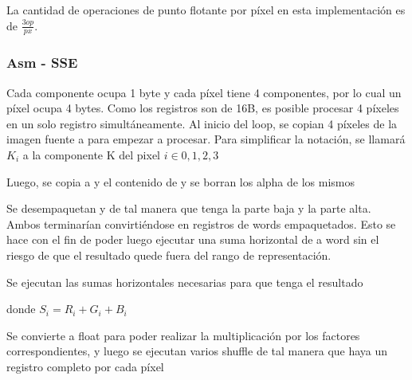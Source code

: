 La cantidad de operaciones de punto flotante por píxel en esta implementación es de $\frac{3op}{px}$.

\subsubsection{Asm - SSE}

Cada componente ocupa 1 byte y cada píxel tiene 4 componentes, por lo cual un píxel ocupa 4 bytes. Como los registros \xmm{} son de 16B, es posible procesar 4 píxeles en un solo registro simultáneamente.
Al inicio del loop, se copian 4 píxeles de la imagen fuente a  para empezar a procesar. Para simplificar la notación, se llamará $K_{i}$ a la componente K del pixel $i \in {0,1,2,3}$

 

Luego, se copia a  y  el contenido de  y se borran los alpha de los mismos

 

 

Se desempaquetan  y  de tal manera que  tenga la parte baja y  la parte alta. Ambos terminarían convirtiéndose en registros de words empaquetados. Esto se hace con el fin de poder luego ejecutar una suma horizontal de a word sin el riesgo de que el resultado quede fuera del rango de representación.

 

 

Se ejecutan las sumas horizontales necesarias para que  tenga el resultado

 

donde $S_{i} = R_{i} + G_{i} + B_{i}$

Se convierte  a float para poder realizar la multiplicación por los factores correspondientes, y luego se ejecutan varios shuffle de tal manera que haya un registro completo por cada píxel

